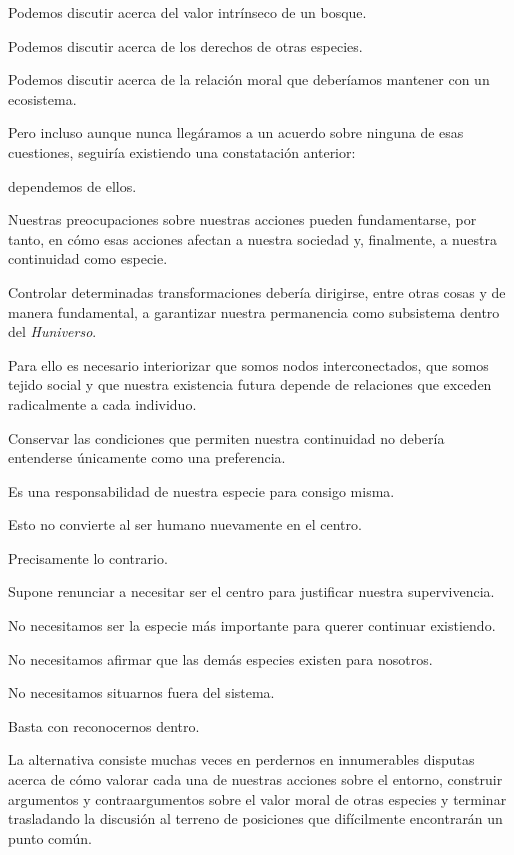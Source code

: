 \documentclass[12pt,a4paper]{article}
\begin{document}
Podemos discutir acerca del valor intrínseco de un bosque.

Podemos discutir acerca de los derechos de otras especies.

Podemos discutir acerca de la relación moral que deberíamos mantener con un ecosistema.

Pero incluso aunque nunca llegáramos a un acuerdo sobre ninguna de esas cuestiones, seguiría existiendo una constatación anterior:

dependemos de ellos.

Nuestras preocupaciones sobre nuestras acciones pueden fundamentarse, por tanto, en cómo esas acciones afectan a nuestra sociedad y, finalmente, a nuestra continuidad como especie.

Controlar determinadas transformaciones debería dirigirse, entre otras cosas y de manera fundamental, a garantizar nuestra permanencia como subsistema dentro del \emph{Huniverso}.

Para ello es necesario interiorizar que somos nodos interconectados, que somos tejido social y que nuestra existencia futura depende de relaciones que exceden radicalmente a cada individuo.

Conservar las condiciones que permiten nuestra continuidad no debería entenderse únicamente como una preferencia.

Es una responsabilidad de nuestra especie para consigo misma.

Esto no convierte al ser humano nuevamente en el centro.

Precisamente lo contrario.

Supone renunciar a necesitar ser el centro para justificar nuestra supervivencia.

No necesitamos ser la especie más importante para querer continuar existiendo.

No necesitamos afirmar que las demás especies existen para nosotros.

No necesitamos situarnos fuera del sistema.

Basta con reconocernos dentro.

La alternativa consiste muchas veces en perdernos en innumerables disputas acerca de cómo valorar cada una de nuestras acciones sobre el entorno, construir argumentos y contraargumentos sobre el valor moral de otras especies y terminar trasladando la discusión al terreno de posiciones que difícilmente encontrarán un punto común.
\end{document}
